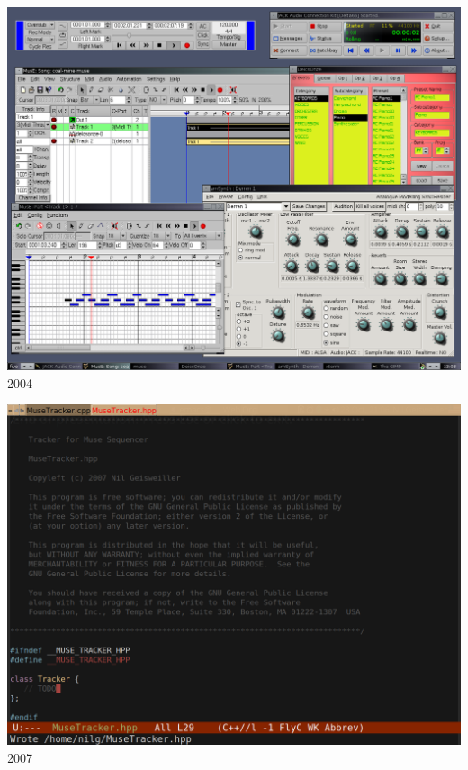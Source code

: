 \documentclass{beamer}
\begin{document}
\begin{frame}
  \begin{center}
    \includegraphics[scale=0.259]{images/1-jack-qjackctl-muse-sync.png}\\
    2004
  \end{center}
\end{frame}

\begin{frame}
  \begin{center}
    \includegraphics[scale=0.207]{images/muse-tracker.png}\\
    2007
  \end{center}
\end{frame}
\end{document}
